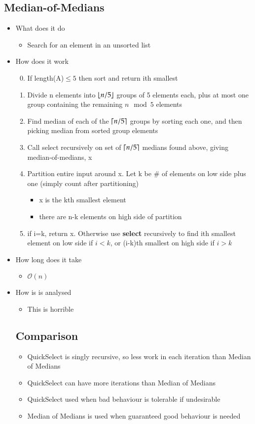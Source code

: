 \documentclass{article}[18pt]
\begin{document}
\subsection{Median-of-Medians}
\begin{itemize}
	\item What does it do
	\begin{itemize}
		\item Search for an element in an unsorted list
	\end{itemize}
	\item How does it work
	\begin{enumerate}
		\setcounter{enumi}{-1}
		\item If length(A)$\leqslant 5$ then sort and return ith smallest
		\item Divide n elements into $\lfloor n/5\rfloor$ groups of 5 elements each, plus at most one group containing the remaining $n\mod 5$ elements
		\item Find median of each of the $\lceil n/5\rceil$ groups by sorting each one, and then picking median from sorted group elements
		\item Call select recursively on set of $\lceil n/5\rceil$ medians found above, giving median-of-medians, x
		\item Partition entire input around x. Let k be \# of elements on low side plus one (simply count after partitioning)
		\begin{itemize}
			\item x is the kth smallest element
			\item there are n-k elements on high side of partition
		\end{itemize} 
		\item if i=k, return x. Otherwise use \textbf{select} recursively to find ith smallest element on low side if $i<k$, or (i-k)th smallest on high side if $i>k$
	\end{enumerate}
	\item How long does it take
	\begin{itemize}
		\item $\mathcal{O}(n)$
	\end{itemize}
	\item How is is analysed
	\begin{itemize}
		\item This is horrible
	\end{itemize}
\subsection{Comparison}
\begin{itemize}
	\item QuickSelect is singly recursive, so less work in each iteration than Median of Medians
	\item QuickSelect can have more iterations than Median of Medians
	\item QuickSelect used when bad behaviour is tolerable if undesirable
	\item Median of Medians is used when guaranteed good behaviour is needed
\end{itemize}

\end{itemize}
\end{document}
